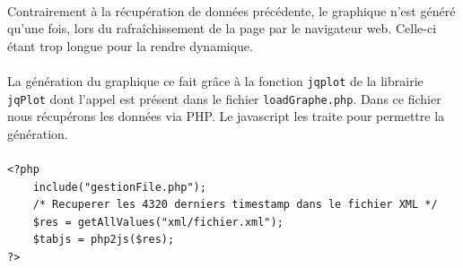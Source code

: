 \documentclass[a4paper, titlepage, oneside, 12pt]{article}%
\begin{document}
\paragraph{}
Contrairement à la récupération de données précédente, le graphique n'est généré qu'une fois, lors du rafraîchissement de la page par le navigateur web. Celle-ci étant trop longue pour la rendre dynamique.
\paragraph{}
La génération du graphique ce fait grâce à la fonction \texttt{jqplot} de la librairie \texttt{jqPlot} dont l'appel est présent dans le fichier \texttt{loadGraphe.php}.
Dans ce fichier nous récupérons les données via PHP. Le javascript les traite pour permettre la génération.
\paragraph{}
\begin{lstlisting}
<?php 
	include("gestionFile.php"); 
	/* Recuperer les 4320 derniers timestamp dans le fichier XML */
	$res = getAllValues("xml/fichier.xml");
	$tabjs = php2js($res);
?>
\end{lstlisting}
\paragraph{}
\end{document}
